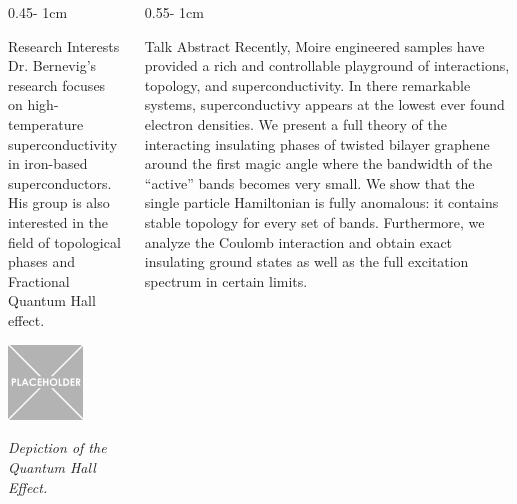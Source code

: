 \documentclass{../psuposter}
\begin{document}
\begin{frame}
\begin{columns}[t, totalwidth=\textwidth]
\begin{column}{0.45\textwidth - 1cm}
    \begin{block}{Research Interests}
        Dr. Bernevig's research focuses on high-temperature superconductivity in iron-based superconductors. His group is also interested in the field of topological phases and Fractional Quantum Hall effect. 
        \begin{center}
	    	\includegraphics[width=0.65\textwidth]{images/research}    		
	    	
    	\textit{Depiction of the Quantum Hall Effect.} 
    	\end{center}


    \end{block}
\end{column}
\begin{column}{0.55\textwidth - 1cm}


    \begin{block}{Talk Abstract}
    	Recently, Moire engineered samples have provided a rich and controllable playground of interactions, topology, and superconductivity. In there remarkable systems, superconductivy appears at the lowest ever found electron densities. We present a full theory of the interacting insulating phases of twisted bilayer graphene around the first magic angle where the bandwidth of the “active” bands becomes very small. We show that the single particle Hamiltonian is fully anomalous: it contains stable topology for every set of bands. Furthermore, we analyze the Coulomb interaction and obtain exact insulating ground states as well as the full excitation spectrum in certain limits.
    \end{block}



\end{column}
\end{columns}
\end{frame}
\end{document}

